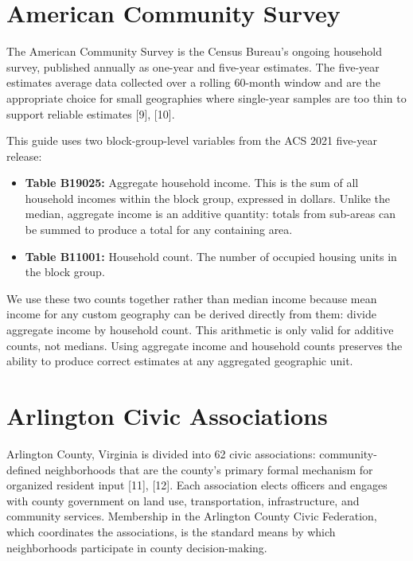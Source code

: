 \documentclass[
  letterpaper,
  DIV=11,
  numbers=noendperiod]{scrreprt}
\providecommand{\tightlist}{%
  \setlength{\itemsep}{0pt}\setlength{\parskip}{0pt}}
\begin{document}
\section{American Community Survey}\label{american-community-survey}

The American Community Survey is the Census Bureau's ongoing household
survey, published annually as one-year and five-year estimates. The
five-year estimates average data collected over a rolling 60-month
window and are the appropriate choice for small geographies where
single-year samples are too thin to support reliable estimates {[}9{]},
{[}10{]}.

This guide uses two block-group-level variables from the ACS 2021
five-year release:

\begin{itemize}
\tightlist
\item
  \textbf{Table B19025:} Aggregate household income. This is the sum of
  all household incomes within the block group, expressed in dollars.
  Unlike the median, aggregate income is an additive quantity: totals
  from sub-areas can be summed to produce a total for any containing
  area.
\item
  \textbf{Table B11001:} Household count. The number of occupied housing
  units in the block group.
\end{itemize}

We use these two counts together rather than median income because mean
income for any custom geography can be derived directly from them:
divide aggregate income by household count. This arithmetic is only
valid for additive counts, not medians. Using aggregate income and
household counts preserves the ability to produce correct estimates at
any aggregated geographic unit.

\section{Arlington Civic
Associations}\label{arlington-civic-associations}

Arlington County, Virginia is divided into 62 civic associations:
community-defined neighborhoods that are the county's primary formal
mechanism for organized resident input {[}11{]}, {[}12{]}. Each
association elects officers and engages with county government on land
use, transportation, infrastructure, and community services. Membership
in the Arlington County Civic Federation, which coordinates the
associations, is the standard means by which neighborhoods participate
in county decision-making.
\end{document}
